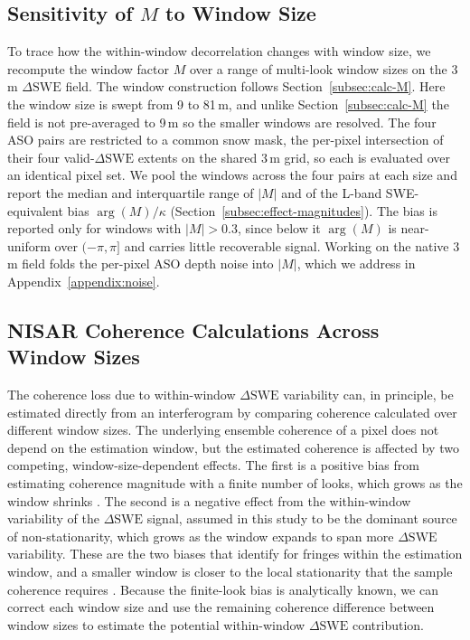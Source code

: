 \documentclass[tc, manuscript]{copernicus}
\begin{document}
\subsection{Sensitivity of $M$ to Window Size}\label{subsec:sensitivity-of-m-to-window-size}

To trace how the within-window decorrelation changes with window size, we recompute the window factor $M$ over a range of multi-look window sizes on the 3\,\unit{m} $\Delta\mathrm{SWE}$ field. The window construction follows Section~\ref{subsec:calc-M}. Here the window size is swept from 9 to 81\,\unit{m}, and unlike Section~\ref{subsec:calc-M} the field is not pre-averaged to 9\,\unit{m} so the smaller windows are resolved. The four ASO pairs are restricted to a common snow mask, the per-pixel intersection of their four valid-$\Delta\mathrm{SWE}$ extents on the shared 3\,\unit{m} grid, so each is evaluated over an identical pixel set. We pool the windows across the four pairs at each size and report the median and interquartile range of $|M|$ and of the L-band SWE-equivalent bias $\arg(M)/\kappa$ (Section~\ref{subsec:effect-magnitudes}). The bias is reported only for windows with $|M|>0.3$, since below it $\arg(M)$ is near-uniform over $(-\pi,\pi]$ and carries little recoverable signal. Working on the native 3\,\unit{m} field folds the per-pixel ASO depth noise into $|M|$, which we address in Appendix~\ref{appendix:noise}.

\subsection{NISAR Coherence Calculations Across Window Sizes}\label{subsec:nisar-coherence-calc}

The coherence loss due to within-window $\Delta\mathrm{SWE}$ variability can, in principle, be estimated directly from an interferogram by comparing coherence calculated over different window sizes. The underlying ensemble coherence of a pixel does not depend on the estimation window, but the estimated coherence is affected by two competing, window-size-dependent effects. The first is a positive bias from estimating coherence magnitude with a finite number of looks, which grows as the window shrinks \citep{Bamler1998}. The second is a negative effect from the within-window variability of the $\Delta\mathrm{SWE}$ signal, assumed in this study to be the dominant source of non-stationarity, which grows as the window expands to span more $\Delta\mathrm{SWE}$ variability. These are the two biases that \citet{zebker2005accurate-421} identify for fringes within the estimation window, and a smaller window is closer to the local stationarity that the sample coherence requires \citep{Touzi1999}. Because the finite-look bias is analytically known, we can correct each window size and use the remaining coherence difference between window sizes to estimate the potential within-window $\Delta\mathrm{SWE}$ contribution.
\end{document}
